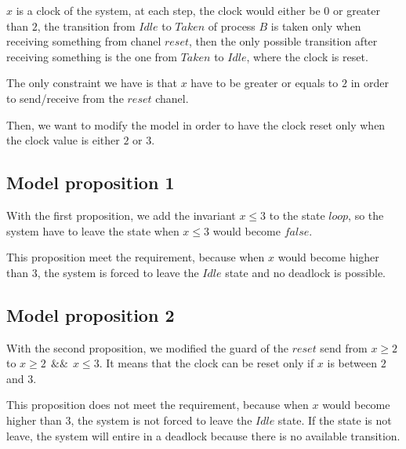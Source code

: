 \documentclass[a4paper,11pt]{report}
\begin{document}
$x$ is a clock of the system, at each step, the clock would either be $0$ or
greater than $2$, the transition from $Idle$ to $Taken$ of process $B$ is taken
only when receiving something from chanel $reset$, then the only possible
transition after receiving something is the one from $Taken$ to $Idle$, where
the clock is reset.

The only constraint we have is that $x$ have to be greater or equals to $2$ in
order to send/receive from the $reset$ chanel.

Then, we want to modify the model in order to have the clock reset only when the
clock value is either $2$ or $3$.

\subsection*{Model proposition 1}

With the first proposition, we add the invariant $x \leq 3$ to the state
$loop$, so the system have to leave the state when $x \leq 3$ would become
$false$.

This proposition meet the requirement, because when $x$ would become higher than
$3$, the system is forced to leave the $Idle$ state and no deadlock is possible.

\subsection*{Model proposition 2}

With the second proposition, we modified the guard of the $reset$ send from $x
\geq 2$ to $x \geq 2\ \ \&\&\ \ x \leq 3$. It means that the clock can be reset
only if $x$ is between $2$ and $3$.

This proposition does not meet the requirement, because when $x$ would become
higher than $3$, the system is not forced to leave the $Idle$ state. If the
state is not leave, the system will entire in a deadlock because there is no
available transition.
\end{document}
